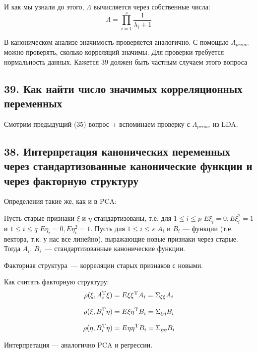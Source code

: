 И как мы узнали до этого, $\Lambda$ вычисляется через собственные числа:
$$ \Lambda = \prod \limits_{i=1}^{s}\frac{1}{\lambda_i+1} $$


В каноническом анализе значимость проверяется аналогично. С помощью $\Lambda_{prime}$ можно проверять, сколько корреляций значимы. Для проверки требуется нормальность данных. 
{\color{blue} Кажется 39 должен быть частным случаем этого вопроса}

\subsection{39. Как найти число значимых корреляционных переменных}
Смотрим предыдущий (35) вопрос + вспоминаем проверку с $\Lambda_{prime}$ из LDA. 

\subsection{38. Интерпретация канонических переменных через стандартизованные канонические функции и через факторную структуру}

Определения такие же, как и в PCA:
\begin{dfn}
Пусть старые признаки  $\xi$ и $\eta$ стандартизованы, т.е. для $1 \leq i \leq p$ $E\xi_i = 0, E\xi_i^2=1$ и 
$1 \leq i \leq q$ $E\eta_i=0, E\eta_i^2=1$. Пусть для $1\leq i \leq s$ $A_i$ и $B_i$ — функции (т.е. вектора, т.к. у нас все линейно), выражающие новые признаки через старые. Тогда $A_i$, $B_i$ — стандартизованные канонические функции.
\end{dfn}

\begin{dfn}
Факторная структура — корреляции старых признаков с новыми.
\end{dfn}
Как считать факторную структуру:
\begin{multline}
\rho(\xi, A^{\mathrm{T}}_i\xi) = E\xi\xi^{\mathrm{T}}A_i = \Sigma_{\xi\xi}A_i
\end{multline} 

\begin{multline}
\rho(\xi, B^{\mathrm{T}}_i\eta) = E\xi\eta^{\mathrm{T}}B_i = \Sigma_{\xi\eta}B_i
\end{multline} 


\begin{multline}
\rho(\eta, B^{\mathrm{T}}_i\eta) = E\eta\eta^{\mathrm{T}}B_i = \Sigma_{\eta\eta}B_i
\end{multline} 

Интерпретация — аналогично PCA и регрессии. 



